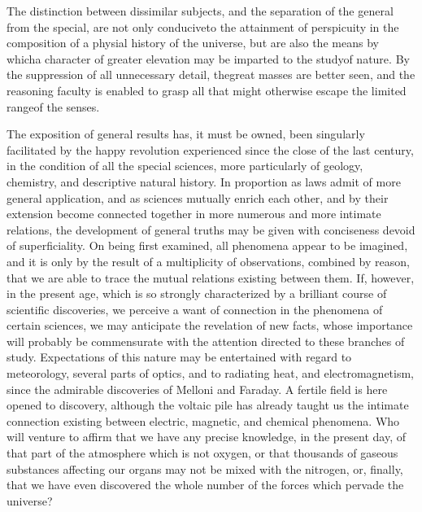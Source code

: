 The distinction between dissimilar subjects, and the separation of the general from the special, are not only conduciveto the attainment of perspicuity in the composition of a physial history of the universe, but are also the means by whicha character of greater elevation may be imparted to the studyof nature. By the suppression of all unnecessary detail, thegreat masses are better seen, and the reasoning faculty is enabled to grasp all that might otherwise escape the limited rangeof the senses.

The exposition of general results has, it must be owned, been singularly facilitated by the happy revolution experienced since the close of the last century, in the condition of all the special sciences, more particularly of geology, chemistry, and descriptive natural history. In proportion as laws admit of more general application, and as sciences mutually enrich each other, and by their extension become connected together in more numerous and more intimate relations, the development of general truths may be given with conciseness devoid of superficiality. On being first examined, all phenomena appear to be imagined, and it is only by the result of a multiplicity of observations, combined by reason, that we are able to trace the mutual relations existing between them. If, however, in the present age, which is so strongly characterized by a brilliant course of scientific discoveries, we perceive a want of connection in the phenomena of certain sciences, we may anticipate the revelation of new facts, whose importance will probably be commensurate with the attention directed to these branches of study. Expectations of this nature may be entertained with regard to meteorology, several parts of optics, and to radiating heat, and electromagnetism, since the admirable discoveries of Melloni and Faraday. A fertile field is here opened to discovery, although the voltaic pile has already taught us the intimate connection existing between electric, magnetic, and chemical phenomena. Who will venture to affirm that we have any precise knowledge, in the present day, of that part of the atmosphere which is not oxygen, or that thousands of gaseous substances affecting our organs may not be mixed with the nitrogen, or, finally, that we have even discovered the whole number of the forces which pervade the universe?

